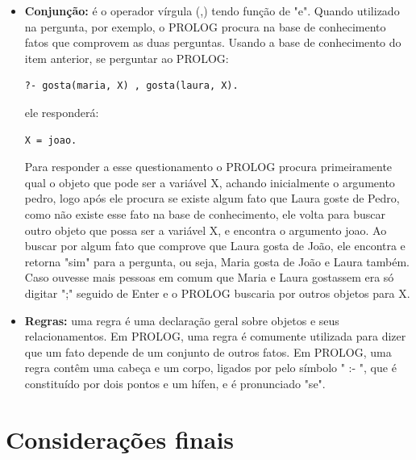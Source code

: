 \begin{itemize}
\item \textbf{Conjunção:} é o operador vírgula (,) tendo função de "e". Quando utilizado na pergunta, por exemplo, o PROLOG procura na base de conhecimento fatos que comprovem as duas perguntas. Usando a base de conhecimento do item anterior, se perguntar ao PROLOG: 
\lstset{language=Prolog}
\begin{lstlisting}
?- gosta(maria, X) , gosta(laura, X).
\end{lstlisting}
ele responderá:
\lstset{language=Prolog}
\begin{lstlisting}
X = joao.
\end{lstlisting}
Para responder a esse questionamento o PROLOG procura primeiramente qual o objeto que pode ser a variável X, achando inicialmente o argumento pedro, logo após ele procura se existe algum fato que Laura goste de Pedro, como não existe esse fato na base de conhecimento, ele volta para buscar outro objeto que possa ser a variável X, e encontra o argumento joao. Ao buscar por algum fato que comprove que Laura gosta de João, ele encontra e retorna "sim" para a pergunta, ou seja, Maria gosta de João e Laura também. Caso ouvesse mais pessoas em comum que Maria e Laura gostassem era só digitar ";" seguido de Enter e o PROLOG buscaria por outros objetos para X.
\item \textbf{Regras:} uma regra é uma declaração geral sobre objetos e seus relacionamentos. Em PROLOG, uma regra é comumente utilizada para dizer que um fato depende de um conjunto de outros fatos. Em PROLOG, uma regra contêm uma cabeça e um corpo, ligados por pelo símbolo " :- ", que é constituído por dois pontos e um hífen, e é pronunciado "se". 
\end{itemize}

\section{Considerações finais}